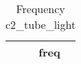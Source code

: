 \begin{table}[htbp]\centering
\def\sym#1{\ifmmode^{#1}\else\(^{#1}\)\fi}
\caption{Frequency c2\_tube\_light \label{tab:"label"}}
\begin{tabular*}{0.9\hsize}{@{\hskip\tabcolsep\extracolsep\fill}l*{1}{c}}
\toprule
                                &     freq\\
\midrule
\bottomrule
\end{tabular*}
\end{table}
